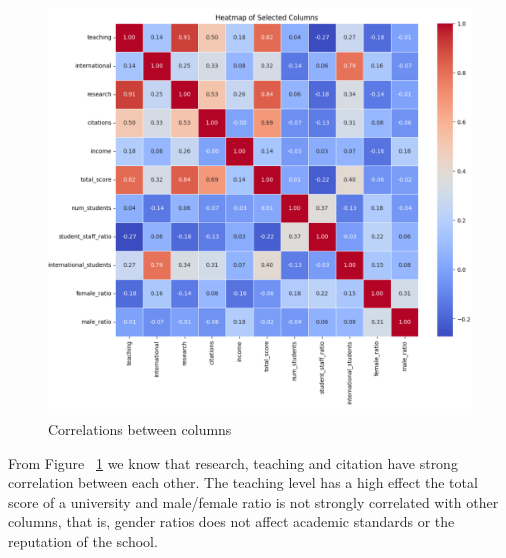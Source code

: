 \documentclass[a4paper]{article}
\begin{document}
\begin{figure}[h]
    \centering
    \includegraphics[scale=0.6]{images/WPlot2.png}
    \caption{Correlations between columns}
    \label{fig:fig:2}
\end{figure}
\FloatBarrier
From Figure ~\ref{fig:fig:2} we know that research, teaching and citation have strong correlation between each other. The teaching level has a high effect the total score of a university and male/female ratio is not strongly correlated with other columns, that is, gender ratios does not affect academic standards or the reputation of the school.
\FloatBarrier
\end{document}
